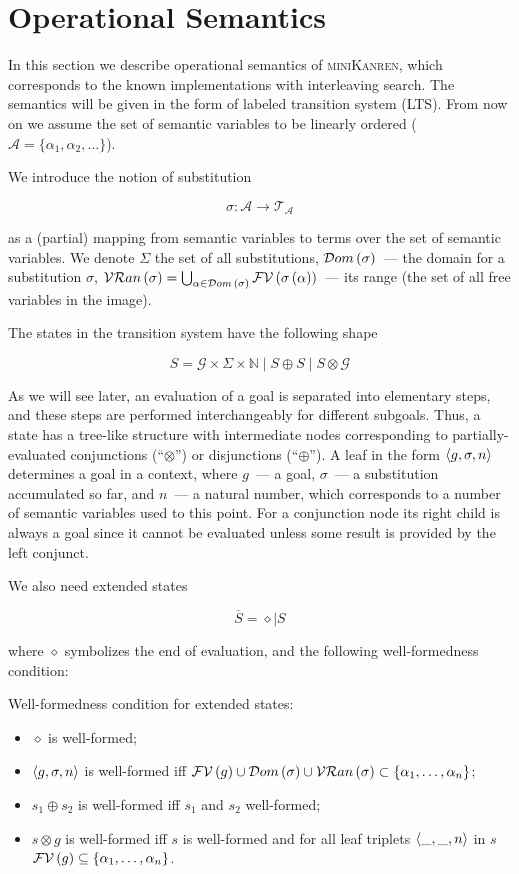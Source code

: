 \section{Operational Semantics}
\label{operational}

In this section we describe operational semantics of \textsc{miniKanren}, which corresponds to the known
implementations with interleaving search. The semantics will be given in the form of labeled transition system (LTS). From now on we
assume the set of semantic variables to be linearly ordered ($\mathcal{A}=\{\alpha_1,\alpha_2,\dots\}$).

We introduce the notion of substitution

\[
  \sigma : \mathcal{A}\to\mathcal{T_A}
\]

as a (partial) mapping from semantic variables to terms over the set of semantic variables. We denote $\Sigma$ the
set of all substitutions, $\mathcal{D}om\,({\sigma})$~--- the domain for a substitution $\sigma$,
$\mathcal{VR}an\,({\sigma})=\bigcup_{\alpha\in\mathcal{D}om\,(\sigma)}\mathcal{FV}\,({\sigma\,(\alpha)})$~--- its range (the set of all free variables in the image).

The states in the transition system have the following shape

\[
S = \mathcal{G}\times\Sigma\times\mathbb{N}\mid S\oplus S \mid S \otimes \mathcal{G}
\]

As we will see later, an evaluation of a goal is separated into elementary steps, and these steps are performed interchangeably for different subgoals. 
Thus, a state has a tree-like structure with intermediate nodes corresponding to partially-evaluated conjunctions (``$\otimes$'') or
disjunctions (``$\oplus$''). A leaf in the form $\left<{g, \sigma, n}\right>$ determines a goal in a context, where $g$~--- a goal, $\sigma$~--- a substitution accumulated so far,
and $n$~--- a natural number, which corresponds to a number of semantic variables used to this point. For a conjunction node its right child is always a goal since
it cannot be evaluated unless some result is provided by the left conjunct.

We also need extended states

\[
\overline{S} = \diamond \mid S
\]

where $\diamond$ symbolizes the end of evaluation, and the following well-formedness condition:

\begin{definition}
  Well-formedness condition for extended states:
  
  \begin{itemize}
  \item $\diamond$ is well-formed;
  \item $\left<{g, \sigma, n}\right>$ is well-formed iff $\mathcal{FV}\,({g})\cup\mathcal{D}om\,({\sigma})\cup\mathcal{VR}an\,({\sigma})\subset\{\alpha_1,\dots,\alpha_n\}$;
  \item $s_1\oplus s_2$ is well-formed iff $s_1$ and $s_2$ well-formed;
  \item $s\otimes g$ is well-formed iff $s$ is well-formed and for all leaf triplets $\left<{\_,\_,n}\right>$ in $s$ $\mathcal{FV}\,({g})\subseteq\{\alpha_1,\dots,\alpha_n\}$.
  \end{itemize}
  
\end{definition}


